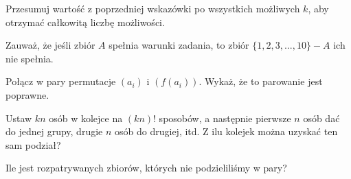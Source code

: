

\begin{hints_list}
	\item Przesumuj wartość z poprzedniej wskazówki po wszystkich możliwych $k$, aby otrzymać całkowitą liczbę możliwości.
	\item Zauważ, że jeśli zbiór $A$ spełnia warunki zadania, to zbiór $\{1, 2, 3, ..., 10\} - A$ ich nie spełnia.
	\item *
	\item Połącz w pary permutacje $(a_i)$ i $(f(a_i))$. Wykaż, że to parowanie jest poprawne.
	\item Ustaw $kn$ osób w kolejce na $(kn)!$ sposobów, a następnie pierwsze $n$ osób dać do jednej grupy, drugie $n$ osób do drugiej, itd. Z ilu kolejek można uzyskać ten sam podział?
	\item Ile jest rozpatrywanych zbiorów, których nie podzieliliśmy w pary?
	\item *
\end{hints_list}